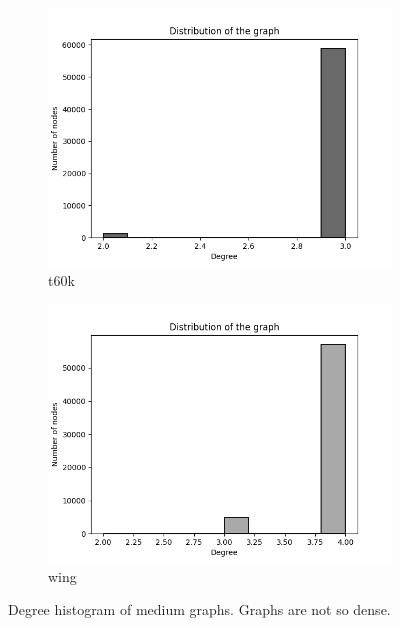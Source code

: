 \begin{figure}[h!]
\begin{subfigure}{.35\textwidth}
  \centering
  \includegraphics[width=\linewidth]{medium_graphs/t60k.png}  
  \caption{t60k}
  \label{fig:sub-third}
\end{subfigure}
\begin{subfigure}{.35\textwidth}
  \centering
  \includegraphics[width=\linewidth]{medium_graphs/wing.png}  
  \caption{wing}
  \label{fig:sub-fourth}
\end{subfigure}
\caption{Degree histogram of medium graphs. Graphs are not so dense.}
\label{fig:fig}
\end{figure}


